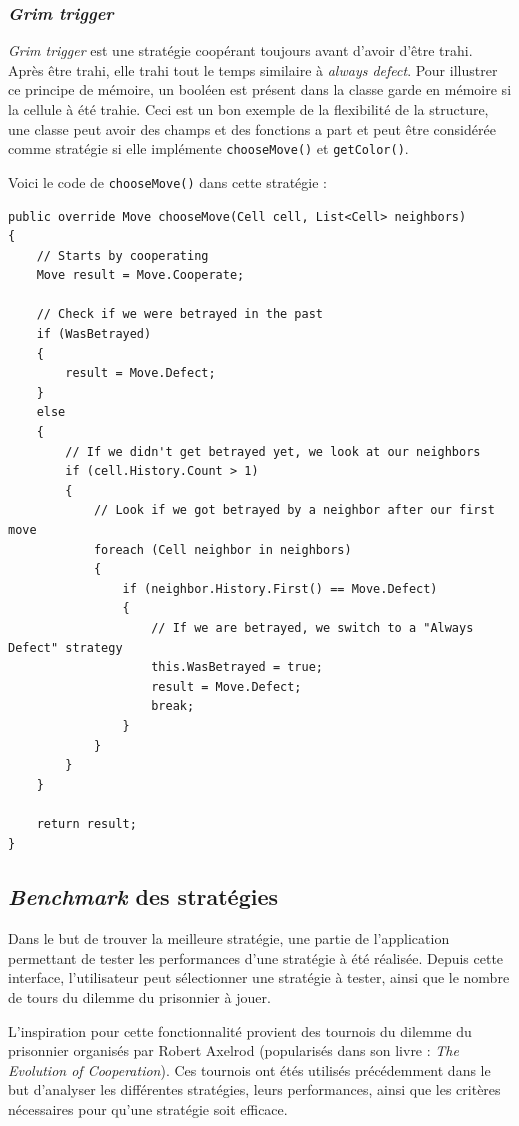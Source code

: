 \documentclass[a4paper, french]{article}
\begin{document}
\pagebreak{}
\subsubsection{\textit{Grim trigger}}
\textit{Grim trigger} est une stratégie coopérant toujours avant d'avoir d'être trahi. Après être trahi, elle trahi tout le temps similaire à \textit{always defect}. Pour illustrer ce principe de mémoire, un booléen est présent dans la classe garde en mémoire si la cellule à été trahie. Ceci est un bon exemple de la flexibilité de la structure, une classe peut avoir des champs et des fonctions a part et peut être considérée comme stratégie si elle implémente \texttt{chooseMove()} et \texttt{getColor()}.

Voici le code de \texttt{chooseMove()} dans cette stratégie :
\begin{lstlisting}
public override Move chooseMove(Cell cell, List<Cell> neighbors)
{
    // Starts by cooperating
    Move result = Move.Cooperate;

    // Check if we were betrayed in the past
    if (WasBetrayed)
    {
        result = Move.Defect;
    }
    else
    {
        // If we didn't get betrayed yet, we look at our neighbors
        if (cell.History.Count > 1)
        {
            // Look if we got betrayed by a neighbor after our first move
            foreach (Cell neighbor in neighbors)
            {
                if (neighbor.History.First() == Move.Defect)
                {
                    // If we are betrayed, we switch to a "Always Defect" strategy
                    this.WasBetrayed = true;
                    result = Move.Defect;
                    break;
                }
            }
        }
    }

    return result;
}
\end{lstlisting}

\pagebreak
\subsection{\textit{Benchmark} des stratégies}
Dans le but de trouver la meilleure stratégie, une partie de l'application permettant de tester les performances d'une stratégie à été réalisée. Depuis cette interface, l'utilisateur peut sélectionner une stratégie à tester, ainsi que le nombre de tours du dilemme du prisonnier à jouer. 

L'inspiration pour cette fonctionnalité provient des tournois du dilemme du prisonnier organisés par Robert Axelrod (popularisés dans son livre : \textit{The Evolution of Cooperation}\cite{book}). Ces tournois ont étés utilisés précédemment dans le but d'analyser les différentes stratégies, leurs performances, ainsi que les critères nécessaires pour qu'une stratégie soit efficace.
\end{document}
